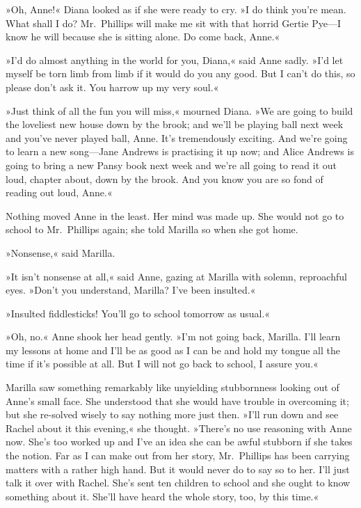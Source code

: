 »Oh, Anne!« Diana looked as if she were ready to cry. »I do think you're mean. What shall I do? Mr.~Phillips will make me sit with that horrid Gertie Pye—I know he will because she is sitting alone. Do come back, Anne.«

»I'd do almost anything in the world for you, Diana,« said Anne sadly. »I'd let myself be torn limb from limb if it would do you any good. But I can't do this, so please don't ask it. You harrow up my very soul.«

»Just think of all the fun you will miss,« mourned Diana. »We are going to build the loveliest new house down by the brook; and we'll be playing ball next week and you've never played ball, Anne. It's tremendously exciting. And we're going to learn a new song—Jane Andrews is practising it up now; and Alice Andrews is going to bring a new Pansy book next week and we're all going to read it out loud, chapter about, down by the brook. And you know you are so fond of reading out loud, Anne.«

Nothing moved Anne in the least. Her mind was made up. She would not go to school to Mr.~Phillips again; she told Marilla so when she got home.

»Nonsense,« said Marilla.

»It isn't nonsense at all,« said Anne, gazing at Marilla with solemn, reproachful eyes. »Don't you understand, Marilla? I've been insulted.«

»Insulted fiddlesticks! You'll go to school tomorrow as usual.«

»Oh, no.« Anne shook her head gently. »I'm not going back, Marilla. I'll learn my lessons at home and I'll be as good as I can be and hold my tongue all the time if it's possible at all. But I will not go back to school, I assure you.«

Marilla saw something remarkably like unyielding stubbornness looking out of Anne's small face. She understood that she would have trouble in overcoming it; but she re-solved wisely to say nothing more just then. »I'll run down and see Rachel about it this evening,« she thought. »There's no use reasoning with Anne now. She's too worked up and I've an idea she can be awful stubborn if she takes the notion. Far as I can make out from her story, Mr.~Phillips has been carrying matters with a rather high hand. But it would never do to say so to her. I'll just talk it over with Rachel. She's sent ten children to school and she ought to know something about it. She'll have heard the whole story, too, by this time.«

